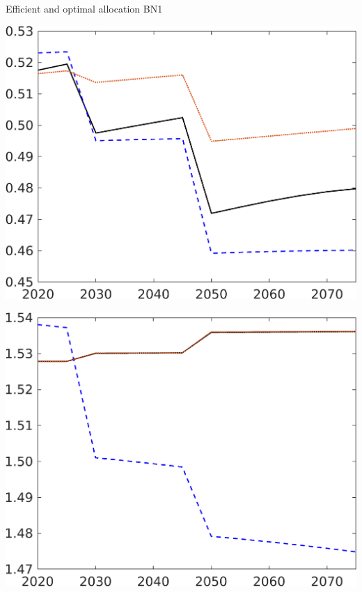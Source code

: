 \documentclass[11pt,aspectratio=169]{beamer}
\begin{document}
\begin{frame}{Efficient and optimal allocation BN1}
\begin{minipage}[]{0.32\textwidth}
	\end{minipage}
	\begin{minipage}[]{0.32\textwidth}
		\includegraphics[width=1\textwidth]{../codding_model/own_basedOnFried/optimalPol_elastS_DisuSci/figures/all_1705/hh_CompEffOPT_T_NoTaus_spillover0_sep1_BN1_ineq0_red1_etaa0.79_lgd0.png}
	\end{minipage}
	\begin{minipage}[]{0.32\textwidth}
		\includegraphics[width=1\textwidth]{../codding_model/own_basedOnFried/optimalPol_elastS_DisuSci/figures/all_1705/hhhl_CompEffOPT_T_NoTaus_spillover0_sep1_BN1_ineq0_red1_etaa0.79_lgd0.png}

\end{minipage}
\end{frame}
\end{document}
